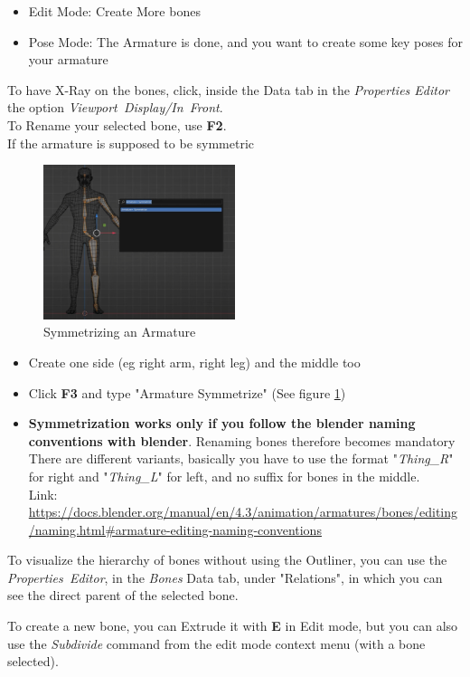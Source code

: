 \documentclass{article}
\begin{document}
\begin{itemize}[noitemsep, topsep=0pt]
    \item Edit Mode: Create More bones
    \item Pose Mode: The Armature is done, and you want to create some key poses for your armature
\end{itemize}
To have X-Ray on the bones, click, inside the Data tab in the \textit{Properties Editor} the option \mbox{\textit{Viewport Display/In Front}}.\\
To Rename your selected bone, use \textbf{F2}.\\
If the armature is supposed to be symmetric
\begin{figure}
    \centering
    \label{symm::armature}
    \includegraphics[width=0.5\textwidth]{blender_docs_images/my_symmetric_armature.png}
    \caption{Symmetrizing an Armature}
\end{figure}
\begin{itemize}[noitemsep, topsep=0pt]
    \item Create one side (eg right arm, right leg) and the middle too
    \item Click \textbf{F3} and type "Armature Symmetrize" (See figure \ref{symm::armature})
    \item \textbf{Symmetrization works only if you follow the blender naming conventions with blender}. Renaming bones therefore becomes mandatory\\
    There are different variants, basically you have to use the format "\textit{Thing\_R}" for right and "\textit{Thing\_L}" for left, and no suffix for bones in the middle.\\
    Link: \href{https://docs.blender.org/manual/en/4.3/animation/armatures/bones/editing/naming.html\#armature-editing-naming-conventions}{https://docs.blender.org/manual/en/4.3/animation/armatures/bones/editing/naming.html\#armature-editing-naming-conventions}
\end{itemize}
To visualize the hierarchy of bones without using the Outliner, you can use the \mbox{\textit{Properties Editor}}, in the \textit{Bones} Data tab, under "Relations", in which you can see the direct
parent of the selected bone.\par
To create a new bone, you can Extrude it with \textbf{E} in Edit mode, but you can also use the \textit{Subdivide} command from the edit mode context menu (with a bone selected).
\end{document}

